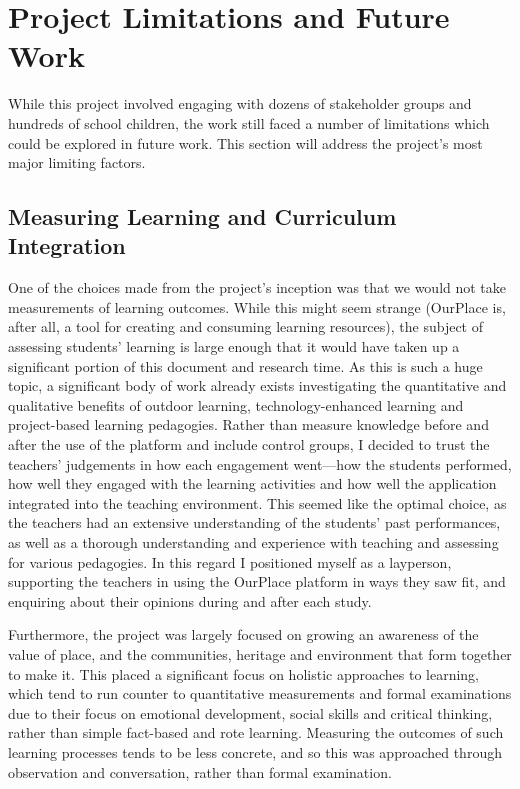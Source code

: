 \section{Project Limitations and Future Work}

While this project involved engaging with dozens of stakeholder groups and hundreds of school children, the work still faced a number of limitations which could be explored in future work. This section will address the project's most major limiting factors.

\subsection*{Measuring Learning and Curriculum Integration}
One of the choices made from the project's inception was that we would not take measurements of learning outcomes. While this might seem strange (OurPlace is, after all, a tool for creating and consuming learning resources), the subject of assessing students' learning is large enough that it would have taken up a significant portion of this document and research time. As this is such a huge topic, a significant body of work already exists investigating the quantitative and qualitative benefits of outdoor learning, technology-enhanced learning and project-based learning pedagogies. Rather than measure knowledge before and after the use of the platform and include control groups, I decided to trust the teachers' judgements in how each engagement went---how the students performed, how well they engaged with the learning activities and how well the application integrated into the teaching environment. This seemed like the optimal choice, as the teachers had an extensive understanding of the students' past performances, as well as a thorough understanding and experience with teaching and assessing for various pedagogies. In this regard I positioned myself as a layperson, supporting the teachers in using the OurPlace platform in ways they saw fit, and enquiring about their opinions during and after each study.

Furthermore, the project was largely focused on growing an awareness of the value of place, and the communities, heritage and environment that form together to make it. This placed a significant focus on holistic approaches to learning, which tend to run counter to quantitative measurements and formal examinations due to their focus on emotional development, social skills and critical thinking, rather than simple fact-based and rote learning. Measuring the outcomes of such learning processes tends to be less concrete, and so this was approached through observation and conversation, rather than formal examination.

